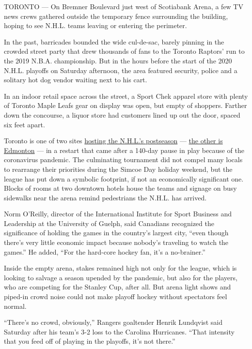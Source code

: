 TORONTO --- On Bremner Boulevard just west of Scotiabank Arena, a few TV
news crews gathered outside the temporary fence surrounding the
building, hoping to see N.H.L. teams leaving or entering the perimeter.

In the past, barricades bounded the wide cul-de-sac, barely pinning in
the crowded street party that drew thousands of fans to the Toronto
Raptors' run to the 2019 N.B.A. championship. But in the hours before
the start of the 2020 N.H.L. playoffs on Saturday afternoon, the area
featured security, police and a solitary hot dog vendor waiting next to
his cart.

In an indoor retail space across the street, a Sport Chek apparel store
with plenty of Toronto Maple Leafs gear on display was open, but empty
of shoppers. Farther down the concourse, a liquor store had customers
lined up out the door, spaced six feet apart.

Toronto is one of two sites
\href{https://www.nytimes.com/2020/07/06/sports/hockey/nhl-playoffs.html}{hosting
the N.H.L.'s postseason} ---
\href{https://www.nytimes.com/2020/08/01/sports/hockey/edmonton-nhl-playoffs.html}{the
other is Edmonton} --- in a restart that came after a 140-day pause in
play because of the coronavirus pandemic. The culminating tournament did
not compel many locals to rearrange their priorities during the Simcoe
Day holiday weekend, but the league has put down a symbolic footprint,
if not an economically significant one. Blocks of rooms at two downtown
hotels house the teams and signage on busy sidewalks near the arena
remind pedestrians the N.H.L. has arrived.

Norm O'Reilly, director of the International Institute for Sport
Business and Leadership at the University of Guelph, said Canadians
recognized the significance of holding the games in the country's
largest city, ``even though there's very little economic impact because
nobody's traveling to watch the games.'' He added, ``For the hard-core
hockey fan, it's a no-brainer.''

Inside the empty arena, stakes remained high not only for the league,
which is looking to salvage a season upended by the pandemic, but also
for the players, who are competing for the Stanley Cup, after all. But
arena light shows and piped-in crowd noise could not make playoff hockey
without spectators feel normal.

``There's no crowd, obviously,'' Rangers goaltender Henrik Lundqvist
said Saturday after his team's 3-2 loss to the Carolina Hurricanes.
``That intensity that you feed off of playing in the playoffs, it's not
there.''


